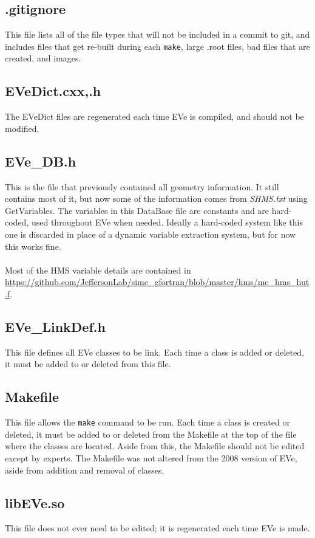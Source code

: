 \documentclass[12pt]{article}
\numberwithin{equation}{section}
\begin{document}
\subsection{.gitignore}
This file lists all of the file types that will not be included in a commit to git, and includes files that get re-built during each \texttt{make}, large .root files, bad files that are created, and images.

\subsection{EVeDict.cxx,.h}
The EVeDict files are regenerated each time EVe is compiled, and should not be modified.

\subsection{EVe\_DB.h}
This is the file that previously contained all geometry information. It still contains most of it, but now some of the information comes from \textit{SHMS.txt} using GetVariables. The variables in this DataBase file are constants and are hard-coded, used throughout EVe when needed. Ideally a hard-coded system like this one is discarded in place of a dynamic variable extraction system, but for now this works fine.
\\
\\
Most of the HMS variable details are contained in \url{https://github.com/JeffersonLab/simc_gfortran/blob/master/hms/mc_hms_hut.f}.

\subsection{EVe\_LinkDef.h}
This file defines all EVe classes to be link. Each time a class is added or deleted, it must be added to or deleted from this file.

\subsection{Makefile}
This file allows the \texttt{make} command to be run. Each time a class is created or deleted, it must be added to or deleted from the Makefile at the top of the file where the classes are located. Aside from this, the Makefile should not be edited except by experts. The Makefile was not altered from the 2008 version of EVe, aside from addition and removal of classes.

\subsection{libEVe.so}
This file does not ever need to be edited; it is regenerated each time EVe is made.
\end{document}
